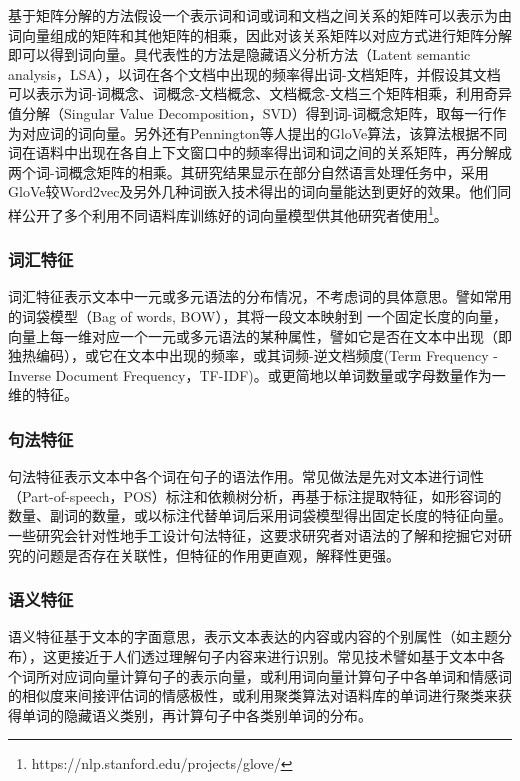 基于矩阵分解的方法假设一个表示词和词或词和文档之间关系的矩阵可以表示为由词向量组成的矩阵和其他矩阵的相乘，因此对该关系矩阵以对应方式进行矩阵分解即可以得到词向量。具代表性的方法是隐藏语义分析方法（Latent semantic analysis，LSA）\cite{deerwester1990indexing}，以词在各个文档中出现的频率得出词-文档矩阵，并假设其文档可以表示为词-词概念、词概念-文档概念、文档概念-文档三个矩阵相乘，利用奇异值分解（Singular Value Decomposition，SVD）得到词-词概念矩阵，取每一行作为对应词的词向量。另外还有Pennington等人\cite{pennington2014glove}提出的GloVe算法，该算法根据不同词在语料中出现在各自上下文窗口中的频率得出词和词之间的关系矩阵，再分解成两个词-词概念矩阵的相乘。其研究结果显示在部分自然语言处理任务中，采用GloVe较Word2vec及另外几种词嵌入技术得出的词向量能达到更好的效果。他们同样公开了多个利用不同语料库训练好的词向量模型供其他研究者使用\footnote{https://nlp.stanford.edu/projects/glove/}。

\subsubsection{词汇特征} %

词汇特征表示文本中一元或多元语法的分布情况，不考虑词的具体意思。譬如常用的词袋模型（Bag of words, BOW），其将一段文本映射到 一个固定长度的向量，向量上每一维对应一个一元或多元语法的某种属性，譬如它是否在文本中出现（即独热编码），或它在文本中出现的频率，或其词频-逆文档频度(Term Frequency - Inverse Document Frequency，TF-IDF)。或更简地以单词数量或字母数量作为一维的特征。

\subsubsection{句法特征} %

句法特征表示文本中各个词在句子的语法作用。常见做法是先对文本进行词性（Part-of-speech，POS）标注和依赖树分析，再基于标注提取特征，如形容词的数量、副词的数量，或以标注代替单词后采用词袋模型得出固定长度的特征向量。一些研究会针对性地手工设计句法特征，这要求研究者对语法的了解和挖掘它对研究的问题是否存在关联性，但特征的作用更直观，解释性更强。

\subsubsection{语义特征} %

语义特征基于文本的字面意思，表示文本表达的内容或内容的个别属性‌（如主题分布），这更接近于人们透过理解句子内容来进行识别。常见技术譬如基于文本中各个词所对应词向量计算句子的表示向量，或利用词向量计算句子中各单词和情感词的相似度来间接评估词的情感极性，或利用聚类算法对语料库的单词进行聚类来获得单词的隐藏语义类别，再计算句子中各类别单词的分布。

